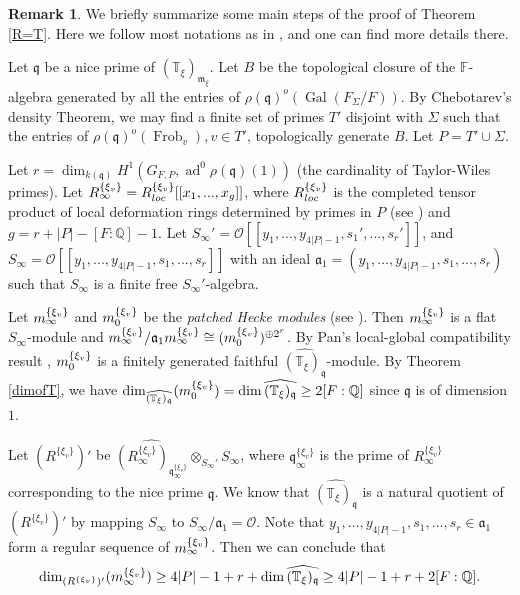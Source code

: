 \documentclass[12pt]{amsart}
\theoremstyle{plain}
\theoremstyle{definition}
\newtheorem{rem}[thm]{Remark}
\theoremstyle{remark}
\begin{document}
\begin{rem}\label{dim of nice}
	We briefly summarize some main steps of the proof of Theorem \ref{R=T}. Here we follow most notations as in \cite[Section 4]{pan2022fontaine}, and one can find more details there.
	
	Let $\mathfrak{q}$ be a nice prime of $(\mathbb{T}_{\xi})_{\mathfrak{m}_{\xi}}$. Let $B$ be the topological closure of the $\mathbb{F}$-algebra generated by all the entries of $\rho(\mathfrak{q})^o(\operatorname{Gal}(F_{\Sigma}/F))$. By Chebotarev’s density Theorem, we may find a finite set of primes $T'$ disjoint with $\Sigma$ such
	that the entries of $\rho(\mathfrak{q})^o(\operatorname{Frob}_v), v \in T'$, topologically generate $B$. Let $P= T' \cup \Sigma$.
	
	Let $r=\operatorname{dim}_{k(\mathfrak{q})} H^1(G_{F,P},\operatorname{ad}^0 \rho(\mathfrak{q})(1))$ (the cardinality of Taylor-Wiles primes). Let $R_{\infty}^{\{\xi_v\}}= R_{\textnormal{loc}}^{\{\xi_v\}}[[x_1, ..., x_g]]$, where $ R_{\textnormal{loc}}^{\{\xi_v\}}$ is the completed tensor product of local deformation rings determined by primes in $P$ (see \cite[Definition 4.2.2]{pan2022fontaine}) and $g=r+|P|-[F:\mathbb{Q}]-1$. Let $S_\infty'=\mathcal{O}[[y_1, ... , y_{4|P|-1}, s_1', ... , s_r']]$, and $S_\infty=\mathcal{O}[[y_1, ... , y_{4|P|-1}, s_1, ... , s_r]]$ with an ideal $\mathfrak{a}_1=(y_1, ... , y_{4|P|-1}, s_1, ... , s_r)$ such that $ S_\infty$ is a finite free $S_\infty'$-algebra.
	
	Let $\textnormal{m}_\infty^{\{\xi_v\}}$ and $\textnormal{m}_0^{\{\xi_v\}}$ be the \textit{patched Hecke modules }(see \cite[Section 4.7]{pan2022fontaine}). Then $\textnormal{m}_\infty^{\{\xi_v\}} $ is a flat  $ S_\infty$-module and $\textnormal{m}_\infty^{\{\xi_v\}}/ \mathfrak{a}_1 \textnormal{m}_\infty^{\{\xi_v\}} \cong (\textnormal{m}_0^{\{\xi_v\}})^{\oplus 2^r}$. By Pan's local-global compatibility result \cite[Corollary 3.5.8]{pan2022fontaine}, $\textnormal{m}_0^{\{\xi_v\}}$ is a finitely generated faithful $\widehat{(\mathbb{T}_{\xi})_{\mathfrak{q}}}$-module. By Theorem \ref{dimofT}, we have $\operatorname{dim}_{\widehat{(\mathbb{T}_{\xi})_{\mathfrak{q}}}} (\textnormal{m}_0^{\{\xi_v\}})= \operatorname{dim} \widehat{(\mathbb{T}_{\xi})_{\mathfrak{q}}} \ge 2[F:\mathbb{Q}]$ since $\mathfrak{q}$ is of dimension $1$.
	
	Let $(R^{\{\xi_v\}})'$ be $\widehat{(R_{\infty}^{\{\xi_v\}})_{\mathfrak{q}_{\infty}^{\{\xi_v\}}}} \otimes_{S_\infty'} S_\infty$, where ${\mathfrak{q}}_{\infty}^{\{\xi_v\}} $ is the prime of $ R_{\infty}^{\{\xi_v\}}$ corresponding to the nice prime $\mathfrak{q}$.	We know that $\widehat{(\mathbb{T}_{\xi})_{\mathfrak{q}}} $ is a natural quotient of $(R^{\{\xi_v\}})'$ by mapping $ S_\infty$ to $S_\infty/ \mathfrak{a}_1=\mathcal{O}$. Note that $ y_1, ... , y_{4|P|-1}, s_1, ... , s_r \in \mathfrak{a}_1$ form a regular sequence of $\textnormal{m}_\infty^{\{\xi_v\}}$. Then we can conclude that $$\operatorname{dim}_{(R^{\{\xi_v\}})'}(\textnormal{m}_\infty^{\{\xi_v\}}) \ge 4|P|-1 +r +\operatorname{dim} \widehat{(\mathbb{T}_{\xi})_{\mathfrak{q}}} \ge 4|P|-1 +r+2[F:\mathbb{Q}].$$
	

\end{rem}
\end{document}
